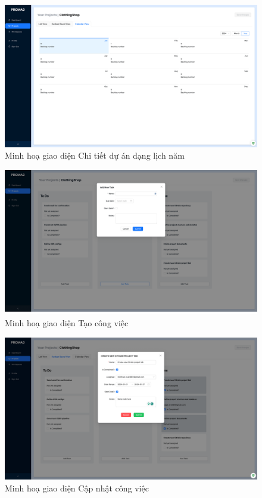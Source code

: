 \documentclass[../DoAn.tex]{subfiles}
\begin{document}
\begin{figure}[H]
    \centering
    \includegraphics[width=1.0\linewidth]{Hinhve/Screenshot_CalendarViewYear.png}
    \caption{Minh hoạ giao diện Chi tiết dự án dạng lịch năm}
    \label{fig:Screenshot_CalendarViewYear}
\end{figure}

\newpage

\begin{figure}[H]
    \centering
    \includegraphics[width=1.0\linewidth]{Hinhve/Screenshot_AddNewTask.png}
    \caption{Minh hoạ giao diện Tạo công việc}
    \label{fig:Screenshot_AddNewTask}
\end{figure}

\begin{figure}[H]
    \centering
    \includegraphics[width=1.0\linewidth]{Hinhve/Screenshot_UpdateTask.png}
    \caption{Minh hoạ giao diện Cập nhật công việc}
    \label{fig:Screenshot_UpdateTask}
\end{figure}
\end{document}
